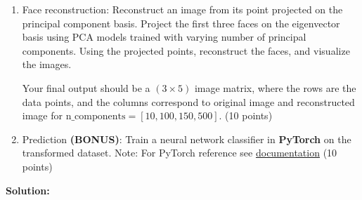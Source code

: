 \documentclass[11pt,letterpaper]{article}
\begin{document}
\begin{enumerate}
\begin{enumerate}[label=(\alph*)]
\item Face reconstruction: 
Reconstruct an image from its point projected on the principal component basis. Project the first three faces on the eigenvector basis using PCA models trained with varying number of principal components. Using the projected points, reconstruct the faces, and visualize  the images.

Your final output should be a $(3\times 5)$ image matrix, where the rows are the data points, and the columns correspond to original image and reconstructed image for $\text{n\_components} =[10,100,150,500]$. (10 points)

\item Prediction \textbf{(BONUS)}: Train a neural network classifier in \textbf{PyTorch} on the transformed dataset. 
Note: For PyTorch reference see \href{https://pytorch.org/docs/stable/index.html}{documentation} (10 points) \\
\end{enumerate}
\textbf{Solution:}
\end{enumerate}



\end{document}
